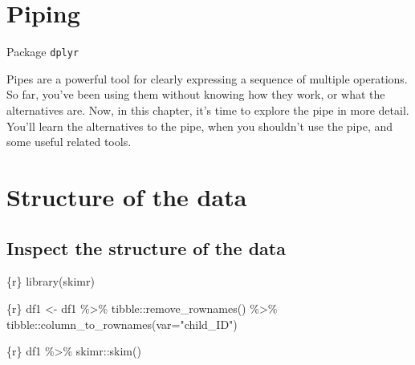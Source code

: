 \documentclass[
  letterpaper,
  DIV=11,
  numbers=noendperiod,
  oneside]{scrreprt}
\newenvironment{Shaded}{\begin{snugshade}}{\end{snugshade}}
\newcommand{\AttributeTok}[1]{\textcolor[rgb]{0.40,0.45,0.13}{#1}}
\newcommand{\FunctionTok}[1]{\textcolor[rgb]{0.28,0.35,0.67}{#1}}
\newcommand{\InformationTok}[1]{\textcolor[rgb]{0.37,0.37,0.37}{#1}}
\newcommand{\NormalTok}[1]{\textcolor[rgb]{0.00,0.23,0.31}{#1}}
\newcommand{\OtherTok}[1]{\textcolor[rgb]{0.00,0.23,0.31}{#1}}
\newcommand{\SpecialCharTok}[1]{\textcolor[rgb]{0.37,0.37,0.37}{#1}}
\newcommand{\StringTok}[1]{\textcolor[rgb]{0.13,0.47,0.30}{#1}}
\begin{document}
\hypertarget{piping}{%
\section{Piping}\label{piping}}

Package \texttt{dplyr}

Pipes are a powerful tool for clearly expressing a sequence of multiple
operations. So far, you've been using them without knowing how they
work, or what the alternatives are. Now, in this chapter, it's time to
explore the pipe in more detail. You'll learn the alternatives to the
pipe, when you shouldn't use the pipe, and some useful related tools.

\hypertarget{structure-of-the-data}{%
\section{Structure of the data}\label{structure-of-the-data}}

\hypertarget{inspect-the-structure-of-the-data}{%
\subsection{Inspect the structure of the
data}\label{inspect-the-structure-of-the-data}}

\begin{Shaded}
\begin{Highlighting}[]
\InformationTok{\textasciigrave{}\textasciigrave{}\textasciigrave{}\{r\}}
\FunctionTok{library}\NormalTok{(skimr)}
\InformationTok{\textasciigrave{}\textasciigrave{}\textasciigrave{}}
\end{Highlighting}
\end{Shaded}

\begin{Shaded}
\begin{Highlighting}[]
\InformationTok{\textasciigrave{}\textasciigrave{}\textasciigrave{}\{r\}}
\NormalTok{df1 }\OtherTok{\textless{}{-}}\NormalTok{ df1 }\SpecialCharTok{\%\textgreater{}\%}
\NormalTok{  tibble}\SpecialCharTok{::}\FunctionTok{remove\_rownames}\NormalTok{() }\SpecialCharTok{\%\textgreater{}\%}
\NormalTok{  tibble}\SpecialCharTok{::}\FunctionTok{column\_to\_rownames}\NormalTok{(}\AttributeTok{var=}\StringTok{"child\_ID"}\NormalTok{)}
\InformationTok{\textasciigrave{}\textasciigrave{}\textasciigrave{}}
\end{Highlighting}
\end{Shaded}

\begin{Shaded}
\begin{Highlighting}[]
\InformationTok{\textasciigrave{}\textasciigrave{}\textasciigrave{}\{r\}}
\NormalTok{df1 }\SpecialCharTok{\%\textgreater{}\%}
\NormalTok{  skimr}\SpecialCharTok{::}\FunctionTok{skim}\NormalTok{()}
\InformationTok{\textasciigrave{}\textasciigrave{}\textasciigrave{}}
\end{Highlighting}
\end{Shaded}
\end{document}
